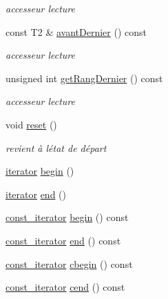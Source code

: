 \begin{DoxyCompactItemize}
\begin{DoxyCompactList}\small\item\em accesseur lecture \end{DoxyCompactList}\item 
const T2 \& \hyperlink{class_simulateur_aca4b266c11eb65f61c0cb958d4232c0f}{avant\+Dernier} () const 
\begin{DoxyCompactList}\small\item\em accesseur lecture \end{DoxyCompactList}\item 
unsigned int \hyperlink{class_simulateur_afc98cbe3954590d6185b8c7c5d9fddd4}{get\+Rang\+Dernier} () const 
\begin{DoxyCompactList}\small\item\em accesseur lecture \end{DoxyCompactList}\item 
void \hyperlink{class_simulateur_a13ab6b17b05b2e70f2677543da4bde29}{reset} ()
\begin{DoxyCompactList}\small\item\em revient à l\textquotesingle{}état de départ \end{DoxyCompactList}\item 
\hyperlink{class_simulateur_1_1iterator}{iterator} \hyperlink{class_simulateur_aed5c2fe918140f59e51b39045263fe95}{begin} ()
\item 
\hyperlink{class_simulateur_1_1iterator}{iterator} \hyperlink{class_simulateur_aa9b6cc97791d4a46672ad5f4c998e6b2}{end} ()
\item 
\hyperlink{class_simulateur_1_1const__iterator}{const\+\_\+iterator} \hyperlink{class_simulateur_a0d59edd64a07747beae2532b1bcf822a}{begin} () const 
\item 
\hyperlink{class_simulateur_1_1const__iterator}{const\+\_\+iterator} \hyperlink{class_simulateur_a1fb0351ecf22dc11327914a1aba67081}{end} () const 
\item 
\hyperlink{class_simulateur_1_1const__iterator}{const\+\_\+iterator} \hyperlink{class_simulateur_a8efcc9d5d6c025fc139c3ad53c6323de}{cbegin} () const 
\item 
\hyperlink{class_simulateur_1_1const__iterator}{const\+\_\+iterator} \hyperlink{class_simulateur_aa69d1c52944b844cb45953ea063e20d2}{cend} () const 
\end{DoxyCompactItemize}
